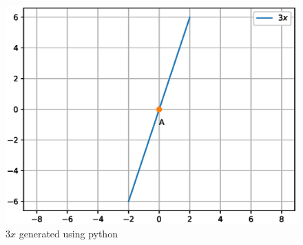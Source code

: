 \begin{enumerate}[label=\thesection.\arabic*.,ref=\thesection.\theenumi]
\begin{figure}[h!]
\centering
\includegraphics[width=\columnwidth]{./figs/eq5.eps}
\caption{$3x$ generated using python}
\label{fig:eq5}
\end{figure} 


\end{enumerate}

